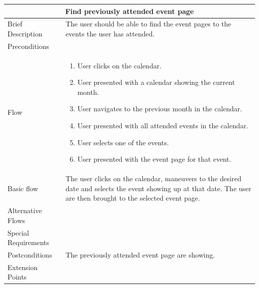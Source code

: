 \begin{minipage}{\linewidth}
\begin{tabular}{|l|p{85mm}|}
  \hline
  \multicolumn{2}{|c|}{\cellcolor{gray!25} \textbf{Find previously attended event page}} \\
  \hline
  Brief Description & The user should be able to find the event pages to the events the user has attended. \\
  Preconditions & \\
  Flow &
    \begin{enumerate}
      \item User clicks on the calendar.
      \item User presented with a calendar showing the current month.
      \item User navigates to the previous month in the calendar.
      \item User presented with all attended events in the calendar.
      \item User selects one of the events.
      \item User presented with the event page for that event.
    \end{enumerate} \\
  Basic flow & The user clicks on the calendar, maneuvers to the desired date and selects the event showing up at that date. The user are then brought to the selected event page. \\
  Alternative Flows & \\
  Special Requirements & \\
  Postconditions & The previously attended event page are showing.\\
  Extension Points & \\
  \hline
\end{tabular}
\end{minipage}

